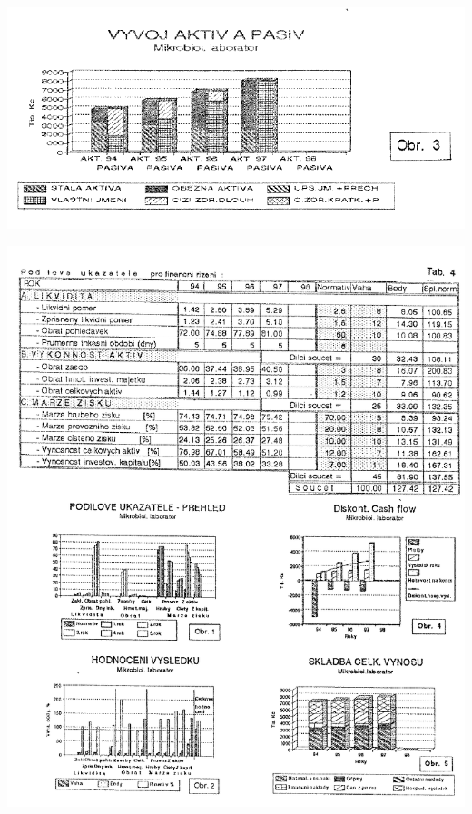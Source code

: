 \documentclass [10pt, fancyhdr, twoside] {article}
\begin{document}
\includegraphics[width=\textwidth,height=\textheight,keepaspectratio]{./vesna3-obr1.png}

\newpage

\includegraphics[width=\textwidth,height=\textheight,keepaspectratio]{./vesna3-obr2.png}

\newpage
\end{document}
